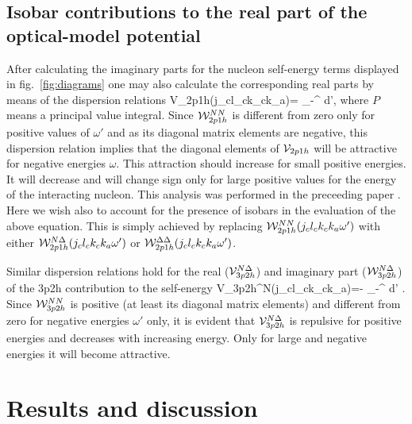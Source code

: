 \subsection{Isobar contributions to the real part of the 
optical-model potential}
After calculating the imaginary parts for the nucleon self-energy terms
displayed in fig.\ \ref{fig:diagrams}  one may also calculate 
the corresponding real
parts by means of the dispersion relations \cite{bhmp93a,bbmp91}
\be
{\cal V}_{2p1h}(j_cl_ck_ck_a\omega)= \int_{-\infty}^{\infty}
 d\omega',
\ee
where $P$ means a principal value integral. Since  ${\cal W}_{2p1h}^{NN}$
is different from zero only for positive values of
$\omega'$ and as its diagonal matrix elements are negative,
this dispersion relation  implies that the diagonal elements of
${\cal V}_{2p1h}$ will be attractive for
negative energies $\omega$. This attraction should increase for small
positive energies. It will decrease and will change sign only for large
positive values for the energy of the interacting nucleon. This analysis 
was performed in the preceeding paper \cite{bhmp93a}. Here
we  wish also to account for the presence of isobars in the
evaluation of the above equation. This is simply achieved by replacing
${\cal W}_{2p1h}^{NN}(j_cl_ck_ck_a\omega')$ with either
${\cal W}_{2p1h}^{N\Delta}(j_cl_ck_ck_a\omega')$ or
${\cal W}_{2p1h}^{\Delta\Delta}(j_cl_ck_ck_a\omega')$. 

Similar dispersion
relations hold for the real (${\cal V}_{3p2h}^{N\Delta}$) and imaginary part (${\cal
W}_{3p2h}^{N\Delta}$) of the 3p2h contribution  to the self-energy
\be
{\cal V}_{3p2h}^{N\Delta}(j_cl_ck_ck_a\omega)=- \int_{-\infty}^{\infty}
 d\omega' .
\ee
Since ${\cal W}_{3p2h}^{NN}$ is positive (at least its diagonal matrix
elements) and
different from zero for negative energies $\omega'$ only, it is evident
that ${\cal V}_{3p2h}^{N\Delta}$ is repulsive for positive energies and decreases
with increasing energy. Only for large and negative energies it will become
attractive. 


\section{Results and discussion}

